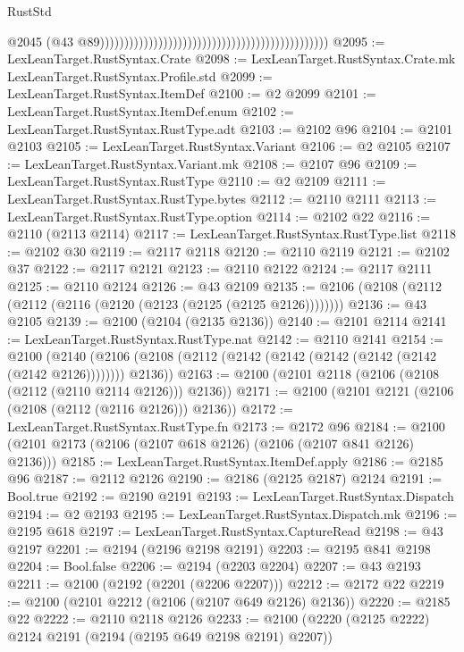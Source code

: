 \begin{lexlean}{RustStd}
\begin{coremodule}
                                                                                                @2045
                                                                                                (@43
                                                                                                  @89)))))))))))))))))))))))))))))))))))))))))))))))
@2095 := LexLeanTarget.RustSyntax.Crate
@2098 := LexLeanTarget.RustSyntax.Crate.mk LexLeanTarget.RustSyntax.Profile.std
@2099 := LexLeanTarget.RustSyntax.ItemDef
@2100 := @2 @2099
@2101 := LexLeanTarget.RustSyntax.ItemDef.enum
@2102 := LexLeanTarget.RustSyntax.RustType.adt
@2103 := @2102 @96
@2104 := @2101 @2103
@2105 := LexLeanTarget.RustSyntax.Variant
@2106 := @2 @2105
@2107 := LexLeanTarget.RustSyntax.Variant.mk
@2108 := @2107 @96
@2109 := LexLeanTarget.RustSyntax.RustType
@2110 := @2 @2109
@2111 := LexLeanTarget.RustSyntax.RustType.bytes
@2112 := @2110 @2111
@2113 := LexLeanTarget.RustSyntax.RustType.option
@2114 := @2102 @22
@2116 := @2110 (@2113 @2114)
@2117 := LexLeanTarget.RustSyntax.RustType.list
@2118 := @2102 @30
@2119 := @2117 @2118
@2120 := @2110 @2119
@2121 := @2102 @37
@2122 := @2117 @2121
@2123 := @2110 @2122
@2124 := @2117 @2111
@2125 := @2110 @2124
@2126 := @43 @2109
@2135 := @2106 (@2108 (@2112 (@2112 (@2116 (@2120 (@2123 (@2125 (@2125 @2126))))))))
@2136 := @43 @2105
@2139 := @2100 (@2104 (@2135 @2136))
@2140 := @2101 @2114
@2141 := LexLeanTarget.RustSyntax.RustType.nat
@2142 := @2110 @2141
@2154 := @2100
    (@2140 (@2106 (@2108 (@2112 (@2142 (@2142 (@2142 (@2142 (@2142 (@2142 @2126)))))))) @2136))
@2163 := @2100 (@2101 @2118 (@2106 (@2108 (@2112 (@2110 @2114 @2126))) @2136))
@2171 := @2100 (@2101 @2121 (@2106 (@2108 (@2112 (@2116 @2126))) @2136))
@2172 := LexLeanTarget.RustSyntax.RustType.fn
@2173 := @2172 @96
@2184 := @2100 (@2101 @2173 (@2106 (@2107 @618 @2126) (@2106 (@2107 @841 @2126) @2136)))
@2185 := LexLeanTarget.RustSyntax.ItemDef.apply
@2186 := @2185 @96
@2187 := @2112 @2126
@2190 := @2186 (@2125 @2187) @2124
@2191 := Bool.true
@2192 := @2190 @2191
@2193 := LexLeanTarget.RustSyntax.Dispatch
@2194 := @2 @2193
@2195 := LexLeanTarget.RustSyntax.Dispatch.mk
@2196 := @2195 @618
@2197 := LexLeanTarget.RustSyntax.CaptureRead
@2198 := @43 @2197
@2201 := @2194 (@2196 @2198 @2191)
@2203 := @2195 @841 @2198
@2204 := Bool.false
@2206 := @2194 (@2203 @2204)
@2207 := @43 @2193
@2211 := @2100 (@2192 (@2201 (@2206 @2207)))
@2212 := @2172 @22
@2219 := @2100 (@2101 @2212 (@2106 (@2107 @649 @2126) @2136))
@2220 := @2185 @22
@2222 := @2110 @2118 @2126
@2233 := @2100 (@2220 (@2125 @2222) @2124 @2191 (@2194 (@2195 @649 @2198 @2191) @2207))

\end{coremodule}
\end{lexlean}
